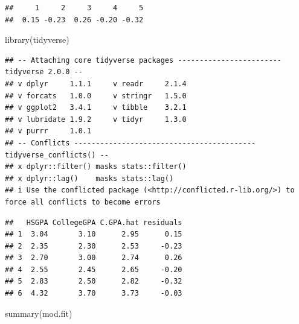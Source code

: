 \documentclass[
]{book}
\newenvironment{Shaded}{\begin{snugshade}}{\end{snugshade}}
\newcommand{\AttributeTok}[1]{\textcolor[rgb]{0.77,0.63,0.00}{#1}}
\newcommand{\DecValTok}[1]{\textcolor[rgb]{0.00,0.00,0.81}{#1}}
\newcommand{\FunctionTok}[1]{\textcolor[rgb]{0.00,0.00,0.00}{#1}}
\newcommand{\NormalTok}[1]{#1}
\newcommand{\OtherTok}[1]{\textcolor[rgb]{0.56,0.35,0.01}{#1}}
\newcommand{\SpecialCharTok}[1]{\textcolor[rgb]{0.00,0.00,0.00}{#1}}
\theoremstyle{definition}
\theoremstyle{definition}
\theoremstyle{definition}
\theoremstyle{definition}
\theoremstyle{remark}
\begin{document}
\begin{verbatim}
##     1     2     3     4     5 
##  0.15 -0.23  0.26 -0.20 -0.32
\end{verbatim}

\begin{Shaded}
\begin{Highlighting}[]
\FunctionTok{library}\NormalTok{(tidyverse)}
\end{Highlighting}
\end{Shaded}

\begin{verbatim}
## -- Attaching core tidyverse packages ------------------------ tidyverse 2.0.0 --
## v dplyr     1.1.1     v readr     2.1.4
## v forcats   1.0.0     v stringr   1.5.0
## v ggplot2   3.4.1     v tibble    3.2.1
## v lubridate 1.9.2     v tidyr     1.3.0
## v purrr     1.0.1     
## -- Conflicts ------------------------------------------ tidyverse_conflicts() --
## x dplyr::filter() masks stats::filter()
## x dplyr::lag()    masks stats::lag()
## i Use the conflicted package (<http://conflicted.r-lib.org/>) to force all conflicts to become errors
\end{verbatim}

\begin{Shaded}
\end{Shaded}

\begin{verbatim}
##   HSGPA CollegeGPA C.GPA.hat residuals
## 1  3.04       3.10      2.95      0.15
## 2  2.35       2.30      2.53     -0.23
## 3  2.70       3.00      2.74      0.26
## 4  2.55       2.45      2.65     -0.20
## 5  2.83       2.50      2.82     -0.32
## 6  4.32       3.70      3.73     -0.03
\end{verbatim}

\begin{Shaded}
\begin{Highlighting}[]
\FunctionTok{summary}\NormalTok{(mod.fit)}
\end{Highlighting}
\end{Shaded}
\end{document}
